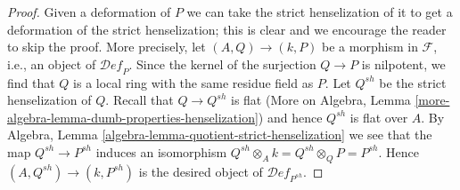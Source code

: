 \documentclass[10pt,a4paper]{amsart}
\theoremstyle{plain}
\theoremstyle{definition}
\theoremstyle{remark}
\numberwithin{equation}{subsection}
\def\Deformationcategory{\mathcal{D}\!\mathit{ef}}
\begin{document}
\begin{proof}
Given a deformation of $P$ we can take the strict henselization
of it to get a deformation of the strict henselization; this is
clear and we encourage the reader to skip the proof. More precisely,
let $(A, Q) \to (k, P)$ be a morphism in $\mathcal{F}$, i.e.,
an object of $\Deformationcategory_P$. Since the kernel of the surjection
$Q \to P$ is nilpotent, we find that $Q$ is a local ring with the
same residue field as $P$. Let $Q^{sh}$ be the strict henselization
of $Q$. Recall that $Q \to Q^{sh}$ is flat
(More on Algebra, Lemma \ref{more-algebra-lemma-dumb-properties-henselization})
and hence $Q^{sh}$ is flat over $A$.
By Algebra, Lemma \ref{algebra-lemma-quotient-strict-henselization}
we see that the map $Q^{sh} \to P^{sh}$ induces an isomorphism
$Q^{sh} \otimes_A k = Q^{sh} \otimes_Q P = P^{sh}$.
Hence $(A, Q^{sh}) \to (k, P^{sh})$ is the desired object of
$\Deformationcategory_{P^{sh}}$.
\end{proof}
\end{document}
